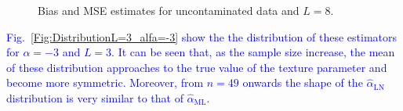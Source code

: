 \documentclass[twocolumn]{svjour3}
\begin{document}
	\begin{figure}[hbt]
		\centering
		\caption{Bias and MSE estimates for uncontaminated data and $L=8$.}\label{SesgoyECMSinContL=8} 
	\end{figure}
	
\textcolor{blue}{
Fig.~\ref{Fig:DistributionL=3_alfa=-3} show the the distribution of these estimators for $\alpha=-3$ and $L=3$. It can be seen that, as the sample size increase, the mean of these distribution approaches to the true value of the texture parameter and become more symmetric. Moreover, from $n=49$ onwards the shape of the $\widehat{\alpha}_{\text{{LN}}}$ distribution is very similar to that of $\widehat{\alpha}_{\text{{ML}}}$.}
\end{document}
